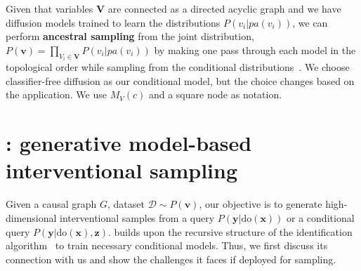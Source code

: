 \documentclass{article}
\newcommand{\red}{\textcolor{red}}
\newcommand{\x}{\mathbf{x}}
\newcommand{\y}{\mathbf{y}}
\newcommand{\V}{\mathbf{V}}
\newcommand{\vb}{\mathbf{v}}
\newcommand{\mbf}{\mathbf}
\newcommand{\Do}{\text{do}}
\newcommand{\data}{\mathcal{D}}
\newcommand{\idgen}{\text{ID-GEN}\xspace}
\theoremstyle{plain}
\theoremstyle{definition}
\theoremstyle{remark}
\begin{document}
%
Given that variables {$\V$} are connected as a directed acyclic graph
and we have diffusion models trained to learn the distributions $P(v_i|pa(v_i))$, we can perform \textbf{ancestral sampling} from the joint distribution, $P(\vb) = \prod_{V_i\in \V} P(v_i|pa(v_i))$ by making one pass through each 
model in the topological order while sampling from the conditional distributions~\citep{bishop2006pattern}.
We choose classifier-free diffusion as our conditional model, but the choice changes based on the application. We use $M_{V}(c)$ and a square node as notation.
%
%
%
 \section{
 \idgen: generative model-based interventional sampling
 }
%
Given a causal graph $G$, dataset $\data\sim P(\vb)$, our objective is to generate high-dimensional interventional samples from a query $P(\y|\Do(\x))$ or a conditional query $P(\y|\Do(\x),\mbf{z}).$
\idgen builds upon the recursive structure of the identification algorithm~\citep{shpitser2008complete} to train necessary conditional models. Thus, we first discuss its connection with us and show the challenges it faces if deployed for sampling.
%
%
%
\end{document}
